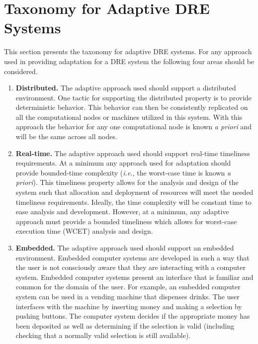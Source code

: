 \documentclass[conference]{IEEEtran}
\begin{document}
\section{Taxonomy for Adaptive DRE Systems}
\label{taxonomy}
This section presents the taxonomy for adaptive DRE systems. For any approach used in providing adaptation for a DRE system the following four areas should be considered.
\begin{enumerate}
\item \textbf{Distributed.} The adaptive approach used should support a distributed environment. One tactic for supporting the distributed property is to provide deterministic behavior. This behavior can then be consistently replicated on all the computational nodes or machines utilized in this system. With this approach the behavior for any one computational node is known \emph{a priori} and will be the same across all nodes.

\item \textbf{Real-time.} The adaptive approach used should support real-time timeliness requirements. At a minimum any approach used for adaptation should provide bounded-time complexity (\emph{i.e.}, the worst-case time is known \emph{a priori}). This timeliness property allows for the analysis and design of the system such that allocation and deployment of resources will meet the needed timeliness requirements. Ideally, the time complexity will be constant time to ease analysis and development. However, at a minimum, any adaptive approach must provide a bounded timeliness which allows for worst-case execution time (WCET) analysis and design.

\item \textbf{Embedded.} The adaptive approach used should support an embedded environment. Embedded computer systems are developed in such a way that the user is not consciously aware that they are interacting with a computer system. Embedded computer systems present an interface that is familiar and common for the domain of the user. For example, an embedded computer system can be used in a vending machine that dispenses drinks. The user interfaces with the machine by inserting money and making a selection by pushing buttons. The computer system decides if the appropriate money has been deposited as well as determining if the selection is valid (including checking that a normally valid selection is still available).


\end{enumerate}
\end{document}
